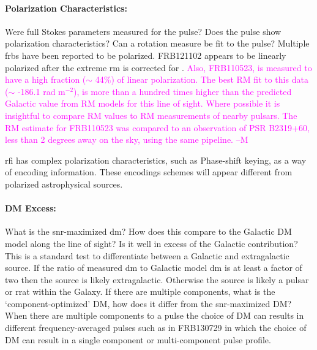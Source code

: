 \documentclass[a4paper,fleqn,usenatbib]{mnras}
\newcommand{\cM}[1]{\textcolor{magenta}{ #1 --M}}
\begin{document}




\paragraph{Polarization Characteristics:}

Were full Stokes parameters measured for the pulse? Does the pulse show
polarization characteristics? Can a rotation measure be fit to the pulse?
Multiple \glspl{frb} have been reported to be polarized.  FRB121102 appears to
be linearly polarized after the extreme \gls{rm} is corrected for
\citep{2018Natur.553..182M}. \cM{Also, FRB110523, is measured to have a high  fraction ($\sim$ 44\%) of linear polarization. The best RM fit to this data ($\sim$ -186.1 rad m$^{-2}$), is more than a hundred times higher than the predicted Galactic value from RM models for this line of sight. Where possible it is insightful to compare RM values to RM measurements of nearby pulsars. The RM estimate for FRB110523 was compared to an observation of PSR B2319+60, less than 2 degrees away on the sky, using the same pipeline.}

\gls{rfi} has complex polarization
characteristics, such as Phase-shift keying, as a way of encoding information.
These encodings schemes will appear different from polarized astrophysical
sources.

\paragraph{DM Excess:}

What is the \gls{snr}-maximized \gls{dm}? How does this compare to the Galactic
DM model along the line of sight? Is it well in excess of the Galactic
contribution? This is a standard test to differentiate between a Galactic and
extragalactic source. If the ratio of measured \gls{dm} to Galactic model
\gls{dm} is at least a factor of two then the source is likely extragalactic.
Otherwise the source is likely a pulsar or \gls{rrat} within the Galaxy.  If
there are multiple components, what is the `component-optimized' DM, how does it
differ from the \gls{snr}-maximized DM? When there are multiple components to a
pulse the choice of DM can results in different frequency-averaged pulses such
as in FRB130729 in which the choice of DM can result in a single component or
multi-component pulse profile. 
\end{document}
